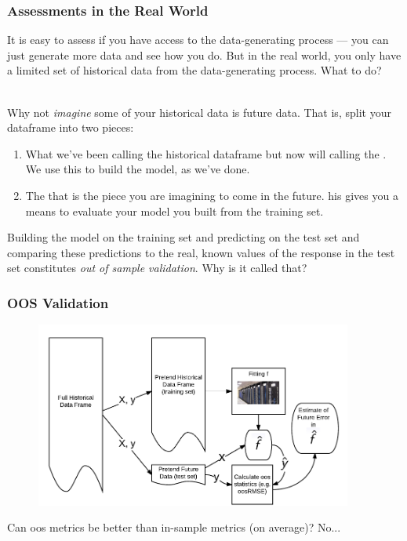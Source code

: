 \documentclass[handout]{beamer}
\begin{document}
\begin{frame}\frametitle{Assessments in the Real World}
\small
It is easy to assess if you have access to the data-generating process --- you can just generate more data and see how you do. But in the real world, you only have a limited set of historical data from the data-generating process. What to do?\\~\\ \pause

Why not \textit{imagine} some of your historical data is future data. That is, split your dataframe into two pieces:

\begin{enumerate}
\item What we've been calling the historical dataframe but now will calling the . We use this to build the model, as we've done. \pause
\item The  that is the piece you are imagining to come in the future. his gives you a means to evaluate your model you built from the training set. \pause
\end{enumerate}

Building the model on the training set and predicting on the test set and comparing these predictions to the real, known values of the response in the test set constitutes \textit{out of sample validation}. Why is it called that?

\end{frame}

\begin{frame}\frametitle{OOS Validation}

\begin{figure}
\centering
\includegraphics[width=4.1in]{oos_validation}
\end{figure}

Can oos metrics be better than in-sample metrics (on average)? \pause No...
\end{frame}
\end{document}
